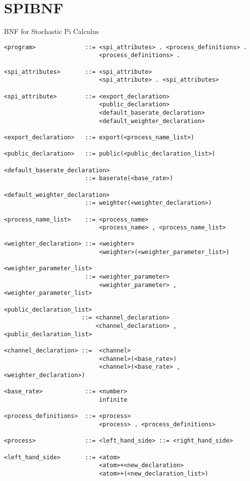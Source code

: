 \appendix
\chapter{SPIBNF}
\label{SPIBNF}
BNF for Stochastic Pi Calculus

\begin{verbatim}
<program>              ::= <spi_attributes> . <process_definitions> .
                           <process_definitions> .

<spi_attributes>       ::= <spi_attribute>
                           <spi_attribute> . <spi_attributes>

<spi_attribute>        ::= <export_declaration>
                           <public_declaration>
                           <default_baserate_declaration>
                           <default_weighter_declaration>

<export_declaration>   ::= export(<process_name_list>)

<public_declaration>   ::= public(<public_declaration_list>)

<default_baserate_declaration>
                       ::= baserate(<base_rate>)

<default_weighter_declaration>
                       ::= weighter(<weighter_declaration>)

<process_name_list>    ::= <process_name>
                           <process_name> , <process_name_list>

<weighter_declaration> ::= <weighter>
                           <weighter>(<weighter_parameter_list>)

<weighter_parameter_list>
                       ::= <weighter_parameter>
                           <weighter_parameter> , <weighter_parameter_list>

<public_declaration_list>
                      ::= <channel_declaration>
                          <channel_declaration> , <public_declaration_list>

<channel_declaration> ::=  <channel>
                           <channel>(<base_rate>)
                           <channel>(<base_rate> , <weighter_declaration>)

<base_rate>            ::= <number>
                           infinite

<process_definitions>  ::= <process>
                           <process> . <process_definitions>

<process>              ::= <left_hand_side> ::= <right_hand_side>

<left_hand_side>       ::= <atom>
                           <atom>+<new_declaration>
                           <atom>+(<new_declaration_list>)


\end{verbatim}
